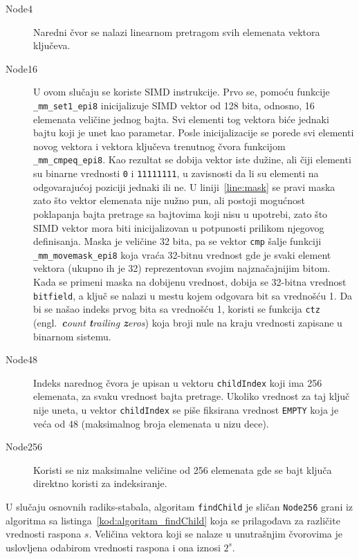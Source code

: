 \documentclass[12pt,oneside]{memoir}
\begin{document}
\begin{description}
  \item[Node4] Naredni čvor se nalazi linearnom
        pretragom svih elemenata
        vektora ključeva.
  \item[Node16] U ovom slučaju se koriste SIMD instrukcije.
        Prvo se, pomoću funkcije \texttt{\_mm\_set1\_epi8} inicijalizuje
        SIMD vektor od 128 bita, odnosno, 16 elemenata veličine jednog bajta. Svi
        elementi tog vektora biće jednaki bajtu koji je unet kao parametar.
        Posle inicijalizacije se porede svi elementi novog vektora i
        vektora ključeva trenutnog čvora funkcijom
        \texttt{\_mm\_cmpeq\_epi8}. Kao rezultat se dobija vektor iste
        dužine, ali čiji elementi su binarne vrednosti \texttt{0}
        i \texttt{11111111}, u zavisnosti da li su elementi na odgovarajućoj
        poziciji jednaki ili ne. U liniji~\ref{line:mask} se pravi
        maska zato što vektor elemenata nije nužno pun, ali postoji
        mogućnost poklapanja bajta pretrage sa bajtovima koji nisu
        u upotrebi, zato što SIMD vektor mora biti inicijalizovan
        u potpunosti prilikom njegovog definisanja.
        Maska je veličine
        32 bita, pa se vektor \texttt{cmp} šalje funkciji
        \texttt{\_mm\_movemask\_epi8} koja vraća 32-bitnu vrednost
        gde je svaki element vektora (ukupno ih je 32) reprezentovan
        svojim najznačajnijim bitom. Kada se primeni maska na dobijenu
        vrednost, dobija se 32-bitna vrednost \texttt{bitfield},
        a ključ se nalazi u mestu kojem odgovara bit sa vrednošću
        1. Da bi se našao indeks prvog bita sa vrednošću 1, koristi
        se funkcija \texttt{ctz}
        (engl.\ \textit{\textbf{c}ount \textbf{t}railing \textbf{z}eros})
        koja broji nule na kraju vrednosti zapisane u binarnom
        sistemu.
  \item[Node48] Indeks narednog čvora je upisan u vektoru
        \texttt{childIndex} koji ima 256 elemenata, za svaku
        vrednost bajta pretrage. Ukoliko vrednost za
        taj ključ nije uneta,
        u vektor \texttt{childIndex} se piše fiksirana
        vrednost \texttt{EMPTY} koja je veća od 48 (maksimalnog
        broja elemenata u nizu dece).
  \item[Node256] Koristi se niz maksimalne veličine od 256 elemenata
        gde se bajt ključa direktno koristi za indeksiranje.
\end{description}

U slučaju osnovnih radiks-stabala, algoritam \texttt{findChild}
je sličan \texttt{Node256} grani iz
algoritma sa listinga~\ref{kod:algoritam_findChild} koja
se prilagođava za različite vrednosti raspona $s$.
Veličina vektora koji se nalaze u unutrašnjim
čvorovima je uslovljena odabirom vrednosti raspona
i ona iznosi $2^{s}$.
\end{document}
